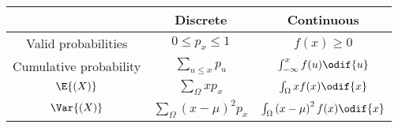 \documentclass{article}
\begin{document}
\begin{table}[H]
    \centering
    \begin{tabular}{c c c }
        \toprule
                                   & \textbf{Discrete}                              & \textbf{Continuous}                                    \\
        \midrule
        Valid probabilities        & \(0 \leq p_x \leq 1\)                          & \(f(x) \geq 0\)                                        \\
        Cumulative probability     & \(\sum_{u \leq x} p_u\)                        & \(\int_{-\infty}^{x} f(u) \odif{u}\)                   \\
        \(\E{\left( X \right)}\)   & \(\sum_{\Omega} xp_x\)                         & \(\int_{\Omega} xf(x)\odif{x}\)                        \\
        \(\Var{\left( X \right)}\) & \(\sum_{\Omega} \left( x - \mu \right)^2 p_x\) & \(\int_{\Omega} \left( x - \mu \right)^2f(x)\odif{x}\) \\
        \bottomrule
    \end{tabular}
\end{table}
\end{document}
